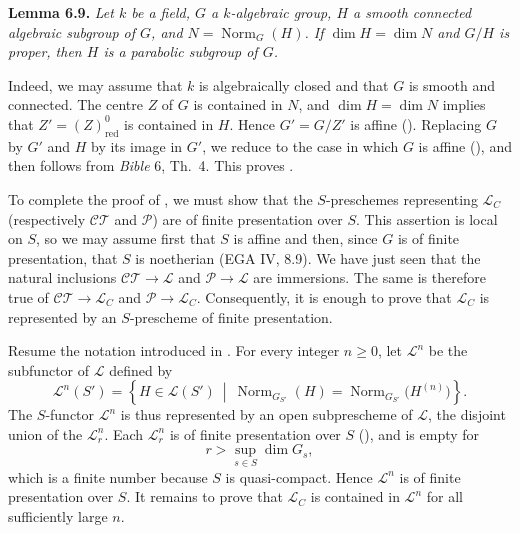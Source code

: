 \textbf{Lemma 6.9.} \emph{Let \(k\) be a field, \(G\) a \(k\)-algebraic group,
\(H\) a smooth connected algebraic subgroup of \(G\), and
\(N=\operatorname{Norm}_G(H)\). If \(\dim H=\dim N\) and \(G/H\) is proper, then
\(H\) is a parabolic subgroup of \(G\).}

Indeed, we may assume that \(k\) is algebraically closed and that \(G\) is smooth
and connected. The centre \(Z\) of \(G\) is contained in \(N\), and
\(\dim H=\dim N\) implies that \(Z'=(Z)^0_{\mathrm{red}}\) is contained in \(H\).
Hence \(G'=G/Z'\) is affine (). Replacing \(G\) by \(G'\) and \(H\)
by its image in \(G'\), we reduce to the case in which \(G\) is affine
(), and  then follows from \emph{Bible} 6, Th.~4.
This proves .

To complete the proof of , we must show that the \(S\)-preschemes representing
\(\mathcal L_C\) (respectively \(\mathcal{CT}\) and \(\mathcal P\)) are of finite
presentation over \(S\). This assertion is local on \(S\), so we may assume first
that \(S\) is affine and then, since \(G\) is of finite presentation, that \(S\) is
noetherian (EGA IV, 8.9). We have just seen that the natural inclusions
\(\mathcal{CT}\to\mathcal L\) and \(\mathcal P\to\mathcal L\) are immersions.
The same is therefore true of
\(\mathcal{CT}\to\mathcal L_C\) and \(\mathcal P\to\mathcal L_C\).
Consequently, it is enough to prove that \(\mathcal L_C\) is represented by an
\(S\)-prescheme of finite presentation.

Resume the notation introduced in . For every integer \(n\geq 0\), let
\(\mathcal L^n\) be the subfunctor of \(\mathcal L\) defined by
\[
\mathcal L^n(S')
 =\left\{H\in\mathcal L(S')\ \middle|\ 
   \operatorname{Norm}_{G_{S'}}(H)
   =\operatorname{Norm}_{G_{S'}}\bigl(H^{(n)}\bigr)\right\}.
\]
The \(S\)-functor \(\mathcal L^n\) is thus represented by an open subprescheme
of \(\mathcal L\), the disjoint union of the \(\mathcal L_r^n\).
Each \(\mathcal L_r^n\) is of finite presentation over \(S\) (), and is empty
for
\[
r>\sup_{s\in S}\dim G_s,
\]
which is a finite number because \(S\) is quasi-compact. Hence \(\mathcal L^n\)
is of finite presentation over \(S\). It remains to prove that
\(\mathcal L_C\) is contained in \(\mathcal L^n\) for all sufficiently large
\(n\).

